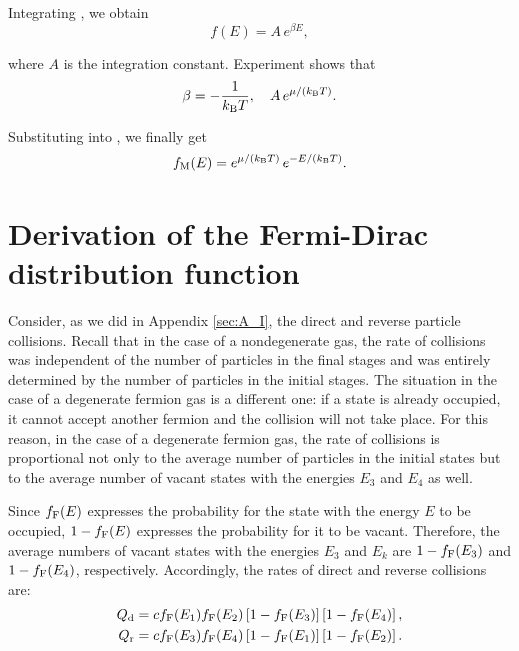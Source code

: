 \noindent
Integrating , we obtain
\begin{equation}\label{eq:A_11}
    f(E) = A\, e^{\beta E},
\end{equation}

\noindent
where $A$ is the integration constant. Experiment shows that
\begin{equation}\label{eq:A_12}
    \beta = -\frac{1}{k_{\text{B}}T},\quad A\, e^{\mu/(k_{\text{B}}T)}.
\end{equation}

Substituting  into , we finally get
\begin{equation}\label{eq:A_13}
    f_{\text{M}}(E) = e^{\mu/(k_{\text{B}}T)}\, e^{-E/(k_{\text{B}}T)}.
\end{equation}

\section{Derivation of the Fermi-Dirac distribution function}\label{sec:A_II}

Consider, as we did in Appendix \ref{sec:A_I}, the direct and reverse particle collisions. Recall that in the case of a nondegenerate gas, the rate of collisions was independent of the number of particles in the final stages and was entirely determined by the number of particles in the initial stages. The situation in the case of a degenerate fermion gas is a different one: if a state is already occupied, it cannot accept another fermion and the collision will not take place. For this reason, in the case of a degenerate fermion gas, the rate of collisions is proportional not only to the average number of particles in the initial states but to the average number of vacant states with the energies $E_3$ and $E_4$ as well.

Since $f_{\text{F}}(E)$ expresses the probability for the state with the energy $E$ to be occupied, $1-f_{\text{F}}(E)$ expresses the probability for it to be vacant. Therefore, the average numbers of vacant states with the energies $E_3$ and $E_k$ are $1-f_{\text{F}}(E_3)$ and $1-f_{\text{F}}(E_4)$, respectively.
Accordingly, the rates of direct and reverse collisions are:
\begin{align}
    Q_{\text{d}} &= cf_{\text{F}}(E_1)f_{\text{F}}(E_2) \left[1-f_{\text{F}}(E_3)\right] \left[1-f_{\text{F}}(E_4)\right], \label{eq:II_1}\\
    Q_{\text{r}} &= cf_{\text{F}}(E_3)f_{\text{F}}(E_4) \left[1-f_{\text{F}}(E_1)\right] \left[1-f_{\text{F}}(E_2)\right]. \label{eq:II_2}
\end{align}


